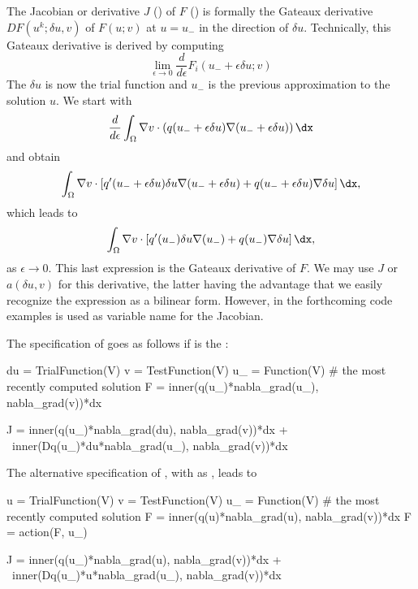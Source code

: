 The Jacobian or derivative $J$ () of $F$ () is formally the
Gateaux derivative $DF(u^k; \delta u, v)$
of $F(u;v)$ at $u=u_{-}$ in the direction of $\delta u$.
Technically, this Gateaux derivative is derived by computing
\begin{equation}
  \lim_{\epsilon\rightarrow 0} \frac{d}{d\epsilon} F_i(u_{-} + \epsilon\delta u; v)
\label{langtangen:poisson:nonlinear:Gateaux1}
\end{equation}
The $\delta u$ is now the trial function and $u_{-}$ is the previous
approximation to the solution $u$.
We start with
\begin{align}
\frac{d}{d\epsilon}\int_\Omega \nabla v\cdot\left( q(u_{-} + \epsilon\delta u)
\nabla (u_{-} + \epsilon\delta u)\right)\dx
\end{align}
and obtain
\begin{align}
\int_\Omega \nabla v\cdot\left\lbrack
q'(u_{-} + \epsilon\delta u)\delta u
\nabla (u_{-} + \epsilon\delta u)
+
q(u_{-} + \epsilon\delta u)
\nabla \delta u
\right\rbrack\dx,
\end{align}
which leads to
\begin{equation}
\int_\Omega \nabla v\cdot\left\lbrack
q'(u_{-})\delta u
\nabla (u_{-})
+
q(u_{-})
\nabla \delta u
\right\rbrack\dx,
\end{equation}
as $\epsilon\rightarrow 0$.  This last expression is the Gateaux
derivative of $F$. We may use $J$ or $a(\delta u, v)$ for this derivative,
the latter having the advantage that we easily recognize the expression
as a bilinear form. However, in the forthcoming code examples 
is used as variable name for the Jacobian.

\clearpage

The specification of 
goes as follows if  is the :
\begin{python}
du = TrialFunction(V)
v  = TestFunction(V)
u_ = Function(V)      # the most recently computed solution
F  = inner(q(u_)*nabla_grad(u_), nabla_grad(v))*dx

J = inner(q(u_)*nabla_grad(du), nabla_grad(v))*dx + \
    inner(Dq(u_)*du*nabla_grad(u_), nabla_grad(v))*dx
\end{python}
The alternative specification of , with  as
, leads to
\begin{python}
u  = TrialFunction(V)
v  = TestFunction(V)
u_ = Function(V)      # the most recently computed solution
F  = inner(q(u)*nabla_grad(u), nabla_grad(v))*dx
F  = action(F, u_)

J = inner(q(u_)*nabla_grad(u), nabla_grad(v))*dx + \
    inner(Dq(u_)*u*nabla_grad(u_), nabla_grad(v))*dx
\end{python}

